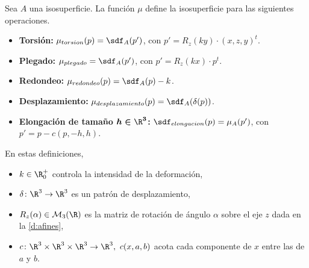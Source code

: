 \begin{definicion}
    Sea $A$ una isosuperficie. La función $\mu$ define la isosuperficie para las siguientes operaciones.
    \begin{itemize}
        
        \item \textbf{Torsión: } $\mu_{torsion}(p) = \sdf_{A}(p')$, con $p' = R_z(ky)\cdot (x,z,y)^t$.
        \item \textbf{Plegado: } $\mu_{plegado} =\sdf_{A}(p')$, con $p' = R_z(kx)\cdot p^t$.
        \item \textbf{Redondeo: } $\mu_{redondeo}(p) = \sdf_{A}(p) - k$.
        \item \textbf{Desplazamiento: } $\mu_{desplazamiento}(p) = \sdf_{A}(\delta(p))$.
        \item \textbf{Elongación de tamaño $\boldsymbol{h\in \R^3}$: } $\sdf_{elongacion}(p) = \mu_{A}(p')$, con $p' = p - c(p, -h, h)$.
    \end{itemize}
    En estas definiciones,
    \begin{itemize}
        \item $k\in \R^+_0$ controla la intensidad de la deformación,
        \item $\delta\colon \R^3\to \R^3$ es un patrón de desplazamiento,
        \item $R_z(\alpha)\in \mathcal{M}_3(\R)$ es la matriz de rotación de ángulo $\alpha$ sobre el eje $z$ dada en la \autoref{d:afines},
        \item $c\colon \R^3\times \R^3 \times \R^3 \to \R^3,\ c(x,a,b)$ acota cada componente de $x$ entre las de $a$ y $b$.
    \end{itemize}
\end{definicion}

